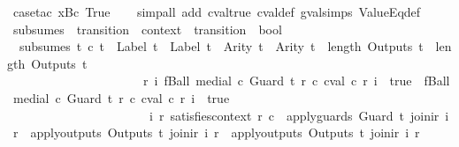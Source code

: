 \begin{isabellebody}
\ {\isacharparenleft}case{\isacharunderscore}tac\ {\isachardoublequoteopen}x{\isacharequal}Bc\ True{\isachardoublequoteclose}{\isacharparenright}\isanewline
\ \ \isamarkupfalse%
\ {\isacharparenleft}simp{\isacharunderscore}all\ add{\isacharcolon}\ cval{\isacharunderscore}true\ cval{\isacharunderscore}def\ gval{\isachardot}simps\ ValueEq{\isacharunderscore}def{\isacharparenright}%
\endisatagproof
{\isafoldproof}%
%
\isadelimproof
\isanewline
%
\endisadelimproof
\isanewline
\isanewline
{}\isamarkupfalse%
\ subsumes\ {\isacharcolon}{\isacharcolon}\ {\isachardoublequoteopen}transition\ {\isasymRightarrow}\ context\ {\isasymRightarrow}\ transition\ {\isasymRightarrow}\ bool{\isachardoublequoteclose}\ {\isacharparenleft}{\isachardoublequoteopen}{\isacharunderscore}\isactrlsub {\isacharunderscore}{\isasymsqsupseteq}{\isacharunderscore}{\isachardoublequoteclose}\ {}{}{\isacharparenright}\ \ \isanewline
\ \ {\isachardoublequoteopen}subsumes\ t{}\ c\ t{}\ {\isasymequiv}\ Label\ t{}\ {\isacharequal}\ Label\ t{}\ {\isasymand}\ Arity\ t{}\ {\isacharequal}\ Arity\ t{}\ {\isasymand}\ length\ {\isacharparenleft}Outputs\ t{}{\isacharparenright}\ {\isacharequal}\ length\ {\isacharparenleft}Outputs\ t{}{\isacharparenright}\ {\isasymand}\isanewline
\ \ \ \ \ \ \ \ \ \ \ \ \ \ \ \ \ \ \ \ \ \ {\isacharparenleft}{\isasymforall}r\ i{\isachardot}\ fBall\ {\isacharparenleft}medial\ c\ {\isacharparenleft}Guard\ t{}{\isacharparenright}\ r{\isacharparenright}\ {\isacharparenleft}{\isasymlambda}c{\isachardot}\ cval\ c\ r\ i\ {\isacharequal}\ true{\isacharparenright}\ {\isasymlongrightarrow}\ fBall\ {\isacharparenleft}medial\ c\ {\isacharparenleft}Guard\ t{}{\isacharparenright}\ r{\isacharparenright}\ {\isacharparenleft}{\isasymlambda}c{\isachardot}\ cval\ c\ r\ i\ {\isacharequal}\ true{\isacharparenright}{\isacharparenright}\ {\isasymand}\isanewline
\ \ \ \ \ \ \ \ \ \ \ \ \ \ \ \ \ \ \ \ \ \ {\isacharparenleft}{\isasymforall}\ i\ r{\isachardot}\ satisfies{\isacharunderscore}context\ r\ c\ {\isasymlongrightarrow}\ apply{\isacharunderscore}guards\ {\isacharparenleft}Guard\ t{}{\isacharparenright}\ {\isacharparenleft}join{\isacharunderscore}ir\ i\ r{\isacharparenright}\ {\isasymlongrightarrow}\ apply{\isacharunderscore}outputs\ {\isacharparenleft}Outputs\ t{}{\isacharparenright}\ {\isacharparenleft}join{\isacharunderscore}ir\ i\ r{\isacharparenright}\ {\isacharequal}\ apply{\isacharunderscore}outputs\ {\isacharparenleft}Outputs\ t{}{\isacharparenright}\ {\isacharparenleft}join{\isacharunderscore}ir\ i\ r{\isacharparenright}{\isacharparenright}\ {\isasymand}\isanewline

\end{isabellebody}
